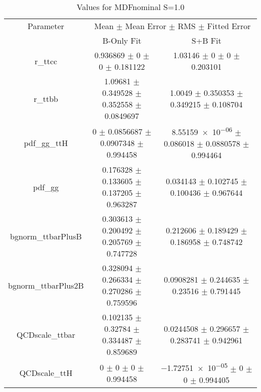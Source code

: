 \begin{table}
\centering
\caption{Values for MDFnominal S=1.0}
\begin{tabular}{ccc}
\toprule
Parameter & \multicolumn{2}{c}{Mean $\pm$ Mean Error $\pm$ RMS $\pm$ Fitted Error}\\
 & B-Only Fit & S+B Fit\\
\midrule
r\_ttcc & \num{0.936869} $\pm$ \num{0} $\pm$ \num{0} $\pm$ \num{0.181122} & \num{1.03146} $\pm$ \num{0} $\pm$ \num{0} $\pm$ \num{0.203101}\\
r\_ttbb & \num{1.09681} $\pm$ \num{0.349528} $\pm$ \num{0.352558} $\pm$ \num{0.0849697} & \num{1.0049} $\pm$ \num{0.350353} $\pm$ \num{0.349215} $\pm$ \num{0.108704}\\
pdf\_gg\_ttH & \num{0} $\pm$ \num{0.0856687} $\pm$ \num{0.0907348} $\pm$ \num{0.994458} & \num{8.55159e-06} $\pm$ \num{0.086018} $\pm$ \num{0.0880578} $\pm$ \num{0.994464}\\
pdf\_gg & \num{0.176328} $\pm$ \num{0.133605} $\pm$ \num{0.137205} $\pm$ \num{0.963287} & \num{0.034143} $\pm$ \num{0.102745} $\pm$ \num{0.100436} $\pm$ \num{0.967644}\\
bgnorm\_ttbarPlusB & \num{0.303613} $\pm$ \num{0.200492} $\pm$ \num{0.205769} $\pm$ \num{0.747728} & \num{0.212606} $\pm$ \num{0.189429} $\pm$ \num{0.186958} $\pm$ \num{0.748742}\\
bgnorm\_ttbarPlus2B & \num{0.328094} $\pm$ \num{0.266334} $\pm$ \num{0.270286} $\pm$ \num{0.759596} & \num{0.0908281} $\pm$ \num{0.244635} $\pm$ \num{0.23516} $\pm$ \num{0.791445}\\
QCDscale\_ttbar & \num{0.102135} $\pm$ \num{0.32784} $\pm$ \num{0.334487} $\pm$ \num{0.859689} & \num{0.0244508} $\pm$ \num{0.296657} $\pm$ \num{0.283741} $\pm$ \num{0.942961}\\
QCDscale\_ttH & \num{0} $\pm$ \num{0} $\pm$ \num{0} $\pm$ \num{0.994458} & \num{-1.72751e-05} $\pm$ \num{0} $\pm$ \num{0} $\pm$ \num{0.994405}\\
\bottomrule
\end{tabular}
\end{table}